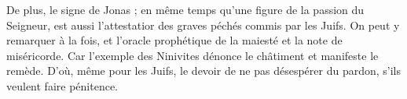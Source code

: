 De plus, le signe de Jonas ; en même temps qu’une figure de la passion du Seigneur, est aussi l’attestatior des graves péchés commis par les Juifs. On peut y remarquer à la fois, et l’oracle prophétique de la maiesté et la note de miséricorde. Car l’exemple des Ninivites dénonce le châtiment et manifeste le remède. D’où, même pour les Juifs, le devoir de ne pas désespérer du pardon, s’ils veulent faire pénitence.

